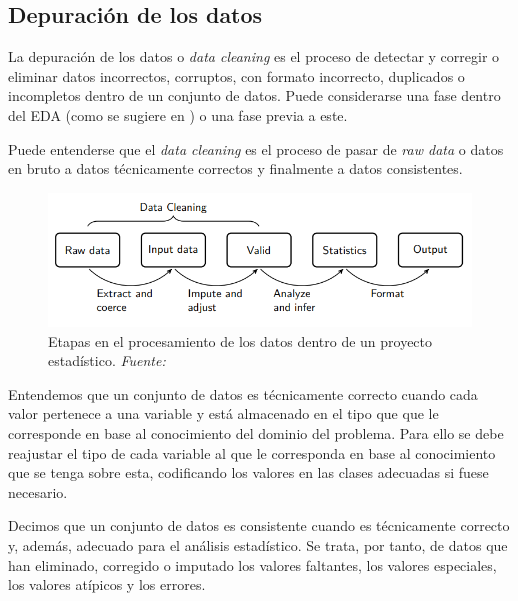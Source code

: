 \documentclass[12pt,a4paper,]{book}
\numberwithin{dummy}{section}
\theoremstyle{ocrenumbox}
\theoremstyle{blacknumex}
\theoremstyle{blacknumbox}
\theoremstyle{ocrenum}
\theoremstyle{ocrenum}
\begin{document}
\hypertarget{depuraciuxf3n-de-los-datos}{%
\subsection{Depuración de los datos}\label{depuraciuxf3n-de-los-datos}}

La depuración de los datos o \emph{data cleaning} es el proceso de
detectar y corregir o eliminar datos incorrectos, corruptos, con formato
incorrecto, duplicados o incompletos dentro de un conjunto de datos.
Puede considerarse una fase dentro del EDA (como se sugiere en
\citet{wickham2016r}) o una fase previa a este.

Puede entenderse que el \emph{data cleaning} es el proceso de pasar de
\emph{raw data} o datos en bruto a datos técnicamente correctos y
finalmente a datos consistentes.

\begin{figure}[H]

{\centering \includegraphics[width=0.95\linewidth]{graficos/statistical_value_chain} 

}

\caption{Etapas en el procesamiento de los datos dentro de un proyecto estadístico. \it Fuente: \citet{van2018statistical}}\label{fig:unnamed-chunk-2}
\end{figure}

Entendemos que un conjunto de datos es técnicamente correcto cuando cada
valor pertenece a una variable y está almacenado en el tipo que que le
corresponde en base al conocimiento del dominio del problema. Para ello
se debe reajustar el tipo de cada variable al que le corresponda en base
al conocimiento que se tenga sobre esta, codificando los valores en las
clases adecuadas si fuese necesario.

Decimos que un conjunto de datos es consistente cuando es técnicamente
correcto y, además, adecuado para el análisis estadístico. Se trata, por
tanto, de datos que han eliminado, corregido o imputado los valores
faltantes, los valores especiales, los valores atípicos y los
errores.\citep{de2013introduction}
\end{document}
